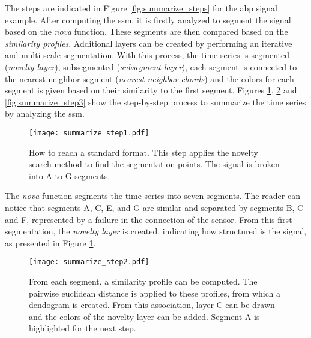The steps are indicated in Figure \ref{fig:summarize_steps} for the \gls{abp} signal example. After computing the \gls{ssm}, it is firstly analyzed to segment the signal based on the \textit{nova} function. These segments are then compared based on the \textit{similarity profiles}. Additional layers can be created by performing an iterative and multi-scale segmentation. With this process, the time series is segmented (\textit{novelty layer}), subsegmented (\textit{subsegment layer}), each segment is connected to the nearest neighbor segment (\textit{nearest neighbor chords}) and the colors for each segment is given based on their similarity to the first segment. Figures \ref{fig:summarize_step1}, \ref{fig:summarize_step2} and \ref{fig:summarize_step3} show the step-by-step process to summarize the time series by analyzing the \gls{ssm}. 

\begin{figure}[b]
\centering
\texttt{[image: summarize\_step1.pdf]}
\caption{How to reach a standard format. This step applies the novelty search method to find the segmentation points. The signal is broken into A to G segments.}
\label{fig:summarize_step1}
\end{figure}

The \textit{nova} function segments the time series into seven segments. The reader can notice that segments A, C, E, and G are similar and separated by segments B, C and F, represented by a failure in the connection of the sensor. From this first segmentation, the \textit{novelty layer} is created, indicating how structured is the signal, as presented in Figure \ref{fig:summarize_step1}.

\begin{figure}
\centering
\texttt{[image: summarize\_step2.pdf]}
\caption{From each segment, a similarity profile can be computed. The pairwise euclidean distance is applied to these profiles, from which a dendogram is created. From this association, layer C can be drawn and the colors of the novelty layer can be added. Segment A is highlighted for the next step.}
\label{fig:summarize_step2}
\end{figure}

